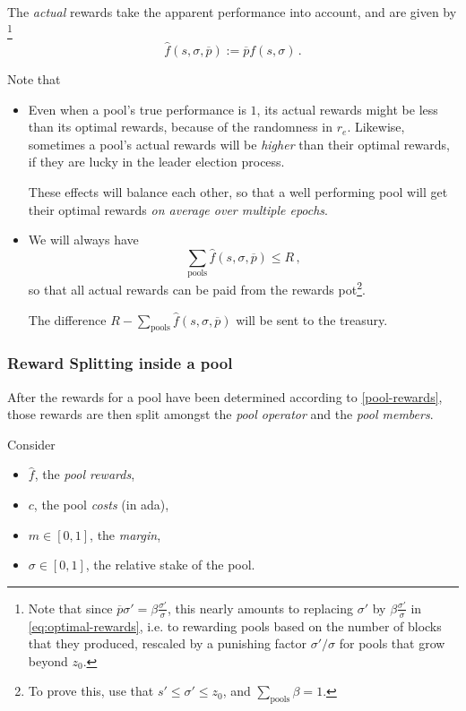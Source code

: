 \documentclass[11pt,a4paper,dvipsnames,twosided]{article}
\newcommand\pbar{\overline{p}}
\begin{document}
The \emph{actual} rewards take the apparent performance into account, and are
given by
\footnote{
  Note that since
  \( \pbar\sigma' = \beta\tfrac{\sigma'}{\sigma}\), this nearly amounts to replacing
  \(\sigma'\) by \(\beta\tfrac{\sigma'}{\sigma}\) in \cref{eq:optimal-rewards}, i.e.
  to rewarding pools based on the number of blocks that they produced, rescaled
  by a punishing factor \(\sigma'/\sigma\) for pools that grow beyond \(z_0\).
}
\[
\hat{f}(s,\sigma,\pbar) := \pbar f(s, \sigma)
\,.
\]

Note that
\begin{itemize}
\item
  Even when a pool's true performance is \(1\), its actual rewards might be less
  than its optimal rewards, because of the randomness in \(r_e\). Likewise,
  sometimes a pool's actual rewards will be \emph{higher} than their optimal
  rewards, if they are lucky in the leader election process.

  These effects will balance each other, so that a well performing pool will get
  their optimal rewards \emph{on average over multiple epochs}.

\item
  We will always have
  \[ \sum_{\text{pools}} \hat{f}(s,\sigma,\pbar) \leq R \,, \]
  so that all actual rewards can be paid from the rewards pot\footnote{ To prove
    this, use that \(s' \leq \sigma' \leq z_0\), and
    \(\sum_{\text{pools}}\beta=1\).}.

  The difference \(R - \sum_{\text{pools}} \hat{f}(s,\sigma,\pbar)\) will be
  sent to the treasury.
\end{itemize}

\subsubsection{Reward Splitting inside a pool}
\label{reward-splitting-inside-a-pool}

After the rewards for a pool have been determined according to
\cref{pool-rewards}, those rewards are then split
amongst the \emph{pool operator} and the \emph{pool members}.

Consider

\begin{itemize}
\item
  \(\hat{f}\), the \emph{pool rewards},
\item
  \(c\), the pool \emph{costs} (in ada),
\item
  \(m\in[0,1]\), the \emph{margin},
\item
  \(\sigma\in[0,1]\), the relative stake of the pool.
\end{itemize}
\end{document}
